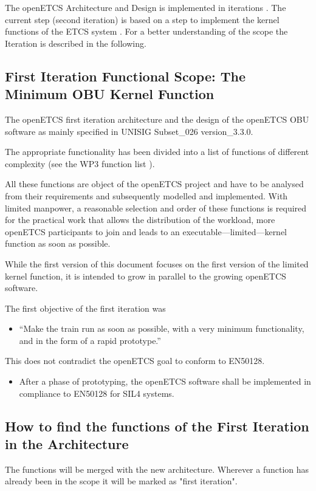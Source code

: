 \documentclass{template/openetcs_report}
\begin{document}
The openETCS Architecture and Design is implemented in iterations \cite{deployment}. The current step (second iteration) is based on a step to implement the kernel functions of the ETCS system \cite{firstIteration}. For a better understanding of the scope the Iteration is described in the following.

\subsection{First Iteration Functional Scope: The Minimum OBU Kernel Function}
\label{sec:FunctionalScopeTheMinimumOBUKernelFunction}

The openETCS first iteration architecture and the design of the openETCS OBU software as mainly specified in \cite{subset-026} UNISIG Subset\_026 version\_3.3.0. 

The appropriate functionality has been divided into a list of functions of different complexity (see the WP3 function list \cite{functions}).

All these functions are object of the openETCS project and have to be analysed from their requirements and subsequently modelled and implemented. With limited manpower, a reasonable selection and order of these functions is required for the practical work that allows the distribution of the workload, more openETCS participants to join and leads to an executable---limited---kernel function as soon as possible. 

While the first version of this document focuses on the first version of the limited kernel function, it is intended to grow in parallel to the growing openETCS software.

The first objective of the first iteration was
\begin{itemize}
	\item ``Make the train run as soon as possible, with a very minimum functionality, and in the form of a rapid prototype.''
\end{itemize}
This does not contradict the openETCS goal to conform to EN50128.
\begin{itemize}
	\item After a phase of prototyping, the openETCS software shall be implemented in compliance to EN50128 for SIL4 systems.
\end{itemize}

\subsection{How to find the functions of the First Iteration in the Architecture}
The functions will be merged with the new architecture. Wherever a function has already been in the scope it will be marked as "first iteration".
\end{document}
